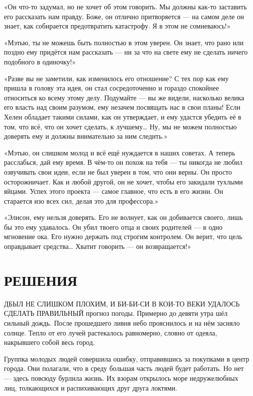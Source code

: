 \documentclass[a5paper, 9pt,
final, openany, twoside=true]{memoir}
\begin{document}
«Он что-то задумал, но не хочет об этом говорить. Мы должны как-то заставить его рассказать нам правду. Боже, он отлично притворяется — на самом деле он знает, как собирается предотвратить катастрофу. Я в этом не сомневаюсь!»

«Мэтью, ты не можешь быть полностью в этом уверен. Он знает, что рано или поздно ему придётся нам рассказать — ни за что на свете ему не сделать ничего подобного в одиночку!»

«Разве вы не заметили, как изменилось его отношение? С тех пор как ему пришла в голову эта идея, он стал сосредоточенно и гораздо спокойнее относиться ко всему этому делу. Подумайте — вы же видели, насколько велика его власть над своим разумом, ему незачем посвящать нас в свои планы! Если Хелен обладает такими силами, как он утверждает, и ему удастся убедить её в том, что всё, что он хочет сделать, к лучшему… Ну, мы не можем полностью доверять ему и должны внимательно за ним следить.»

«Мэтью, он слишком молод и всё ещё нуждается в наших советах. А теперь расслабься, дай ему время. В чём-то он похож на тебя — ты никогда не любил озвучивать свои идеи, если не был уверен в том, что они верны. Он просто осторожничает. Как и любой другой, он не хочет, чтобы его закидали тухлыми яйцами. Успех этого проекта — самое главное, что есть в его жизни. Он старается изо всех сил, делая это для профессора.»

«Элисон, ему нельзя доверять. Его не волнует, как он добивается своего, лишь бы это ему удавалось. Он убил твоего отца и своих родителей — в одно мгновение ока. Его нужно держать под строгим контролем. Он верит, что цель оправдывает средства… Хватит говорить — он возвращается!»
\chapter{РЕШЕНИЯ}
Д{ БЫЛ НЕ СЛИШКОМ ПЛОХИМ, И БИ-БИ-СИ В КОИ-ТО ВЕКИ УДАЛОСЬ СДЕЛАТЬ ПРАВИЛЬНЫЙ} прогноз погоды. Примерно до девяти утра шёл сильный дождь. После прошедшего ливня небо прояснилось и на нём засияло солнце. Тепло от его лучей растекалось равномерно, словно от одеяла, накрывшего собой весь город.

Группка молодых людей совершила ошибку, отправившись за покупками в центр города. Они полагали, что в среду большая часть людей будет работать. Но нет — здесь повсюду бурлила жизнь. Их взорам открылось море недружелюбных лиц, толкающихся и распихивающих друг друга локтями.\bigskip
\end{document}

